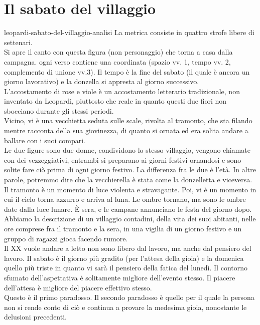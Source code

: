 \documentclass[preview]{standalone}
\begin{document}
\genpage

\section{Il sabato del villaggio}


\begin{snippet}{leopardi-sabato-del-villaggio-analisi}
    La metrica consiste in quattro strofe libere di settenari.
    \\
    Si apre il canto con questa figura (non personaggio) che torna a casa dalla campagna.
    ogni verso contiene una coordinata (spazio vv. 1, tempo vv. 2, complemento di unione vv.3).
    Il tempo è la fine del sabato (il quale è ancora un giorno lavorativo)
    e la donzella si appresta al giorno successivo.
    \\
    L'accostamento di rose e viole è un accostamento letterario tradizionale,
    non inventato da Leopardi, piuttosto che reale in quanto
    questi due fiori non sbocciano durante gli stessi periodi.
    \\
    Vicino, vi è una vecchietta seduta sulle scale, rivolta al tramonto,
    che sta filando mentre racconta della sua giovinezza, di quanto si ornata
    ed era solita andare a ballare con i suoi compari.
    \\
    Le due figure sono due donne, condividono lo stesso villaggio,
    vengono chiamate con dei vezzeggiativi, entrambi si preparano ai giorni festivi ornandosi
    e sono solite fare ciò prima di ogni giorno festivo.
    La differenza fra le due è l'età.
    In altre parole, potremmo dire che la vecchierella è stata come la donzelletta
    e viceversa.
    \\
    Il tramonto è un momento di luce violenta e stravagante. Poi, vi è un momento in cui
    il cielo torna azzurro e arriva al luna. Le ombre tornano, ma sono le ombre date dalla
    luce lunare.
    È sera, e le campane annunciano le festa del giorno dopo.
    \\
    Abbiamo la descrizione di un villaggio contadini, della vita dei suoi abitanti,
    nelle ore comprese fra il tramonto e la sera, in una vigilia di un giorno festivo
    e un gruppo di ragazzi gioca facendo rumore.
    \\
    Il XX vuole andare a letto non sono libero dal lavoro, ma anche dal pensiero del lavoro.
    Il sabato è il giorno più gradito (per l'attesa della gioia) e la domenica quello più triste in quanto
    vi sarà il pensiero della fatica del lunedì.
    Il contorno sfumato dell'aspettativa è solitamente migliore dell'evento stesso.
    Il piacere dell'attesa è migliore del piacere effettivo stesso.
    \\
    Questo è il primo paradosso.
    Il secondo paradosso è quello per il quale la persona non si rende conto di ciò
    e continua a provare la medesima gioia, nonostante le delusioni precedenti.
\end{snippet}
\end{document}
